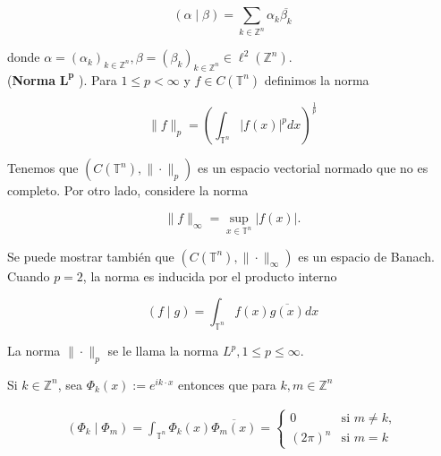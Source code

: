 \documentclass[12pt]{article}
\newcommand\Z{\ensuremath{\mathbb{Z}}}
\newcommand\T{\mathbb{T}}
\begin{document}
$$
(\alpha \mid \beta)=\sum_{k\in \Z^n} \alpha_k \overline{\beta_k}
$$

donde $\alpha=\left(\alpha_k\right)_{k \in \mathbb{Z}^n}, \beta=\left(\beta_k\right)_{k \in \mathbb{Z}^n} \in \ell^2(\mathbb{Z}^n)$.\\



(\textbf{Norma} $\mathbf{L^p}$ ). Para $1 \leq p<\infty$ y $f \in C(\T^n)$ definimos la norma

$$
\|f\|_p=\left(\int_{\T^n}|f(x)|^p d x\right)^{\frac{1}{p}}
$$


Tenemos que $\left(C(\T^n),\|\cdot\|_p\right)$ es un espacio vectorial normado que no es completo.
Por otro lado, considere la norma

$$
\|f\|_{\infty}=\sup _{x \in \T^n}|f(x)| .
$$


Se puede mostrar también que $\left(C(\T^n),\|\cdot\|_{\infty}\right)$ es un espacio de Banach.
Cuando $p=2$, la norma es inducida por el producto interno

$$
(f \mid g)=\int_{\T^n} f(x) \overline{g(x)} d x
$$


La norma $\|\cdot\|_p$ se le llama la norma $L^p, 1 \leq p \leq \infty$.


\begin{theorem}\label{ortogonalidad}
Si $k \in \mathbb{Z}^n$, sea $\Phi_k(x):=e^{i k \cdot x}$ entonces que para $k, m \in \mathbb{Z}^n$

$$
\begin{array}{ll}
\displaystyle\left(\Phi_k \mid \Phi_m\right)=\int_{\T^n} \Phi_k(x) \overline{\Phi_m(x)}=\begin{cases}
0 \quad &\text{si }m\neq  k,\\
(2\pi)^n &\text{si } m=k
\end{cases}
\end{array}
$$
\end{theorem}
\end{document}
